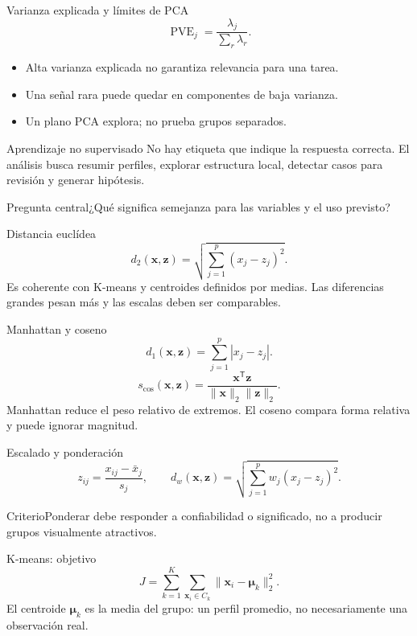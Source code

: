 \documentclass[aspectratio=169,10pt]{beamer}
\begin{document}
\begin{frame}{Varianza explicada y límites de PCA}\small
\[\operatorname{PVE}_j=\frac{\lambda_j}{\sum_r\lambda_r}.\]
\begin{itemize}\item Alta varianza explicada no garantiza relevancia para una tarea.\item Una señal rara puede quedar en componentes de baja varianza.\item Un plano PCA explora; no prueba grupos separados.\end{itemize}
\end{frame}

\begin{frame}{Aprendizaje no supervisado}\small
No hay etiqueta que indique la respuesta correcta. El análisis busca resumir perfiles, explorar estructura local, detectar casos para revisión y generar hipótesis.
\begin{block}{Pregunta central}¿Qué significa semejanza para las variables y el uso previsto?\end{block}
\end{frame}

\begin{frame}{Distancia euclídea}\small
\[d_2(\mathbf{x},\mathbf{z})=\sqrt{\sum_{j=1}^{p}(x_j-z_j)^2}.\]
Es coherente con K-means y centroides definidos por medias. Las diferencias grandes pesan más y las escalas deben ser comparables.
\end{frame}

\begin{frame}{Manhattan y coseno}\small
\[d_1(\mathbf{x},\mathbf{z})=\sum_{j=1}^{p}|x_j-z_j|.\]
\[s_{\cos}(\mathbf{x},\mathbf{z})=\frac{\mathbf{x}^{\mathsf T}\mathbf{z}}{\|\mathbf{x}\|_2\|\mathbf{z}\|_2}.\]
Manhattan reduce el peso relativo de extremos. El coseno compara forma relativa y puede ignorar magnitud.
\end{frame}

\begin{frame}{Escalado y ponderación}\small
\[z_{ij}=\frac{x_{ij}-\bar{x}_j}{s_j},\qquad d_w(\mathbf{x},\mathbf{z})=\sqrt{\sum_{j=1}^{p}w_j(x_j-z_j)^2}.\]
\begin{block}{Criterio}Ponderar debe responder a confiabilidad o significado, no a producir grupos visualmente atractivos.\end{block}
\end{frame}

\begin{frame}{K-means: objetivo}\small
\[J=\sum_{k=1}^{K}\sum_{\mathbf{x}_i\in C_k}\|\mathbf{x}_i-\boldsymbol{\mu}_k\|_2^2.\]
El centroide $\boldsymbol{\mu}_k$ es la media del grupo: un perfil promedio, no necesariamente una observación real.
\end{frame}
\end{document}
